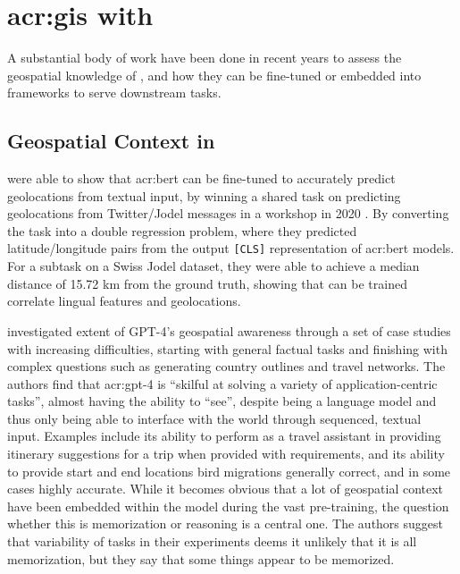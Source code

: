 \section[GIS with LLMs]{\acrshort{acr:gis} with }\label{subsec:gis-with-llms}

A substantial body of work have been done in recent years to assess the geospatial knowledge of , and how they can be fine-tuned or embedded into frameworks to serve downstream tasks.

\subsection[]{Geospatial Context in }

\cite{scherrerHeLjuVarDial20202020} were able to show that \acrshort{acr:bert} can be fine-tuned to accurately predict geolocations from textual input, by winning a shared task on predicting geolocations from Twitter/Jodel messages in a workshop in 2020 \citep{gamanReportVarDialEvaluation2020}. By converting the task into a double regression problem, where they predicted latitude/longitude pairs from the output \texttt{[CLS]} representation of \acrshort{acr:bert} models. For a subtask on a Swiss Jodel dataset, they were able to achieve a median distance of 15.72 km from the ground truth, showing that  can be trained correlate lingual features and geolocations.

\cite{robertsGPT4GEOHowLanguage2023} investigated extent of GPT-4's geospatial awareness through a set of case studies with increasing difficulties, starting with general factual tasks and finishing with complex questions such as generating country outlines and travel networks. The authors find that \acrshort{acr:gpt}-4 is \enquote{skilful at solving a variety of application-centric tasks}, almost having the ability to \enquote{see}, despite being a language model and thus only being able to interface with the world through sequenced, textual input. Examples include its ability to perform as a travel assistant in providing itinerary suggestions for a trip when provided with requirements, and its ability to provide start and end locations bird migrations generally correct, and in some cases highly accurate. While it becomes obvious that a lot of geospatial context have been embedded within the model during the vast pre-training, the question whether this is memorization or reasoning is a central one. The authors suggest that variability of tasks in their experiments deems it unlikely that it is all memorization, but they say that some things appear to be memorized.

